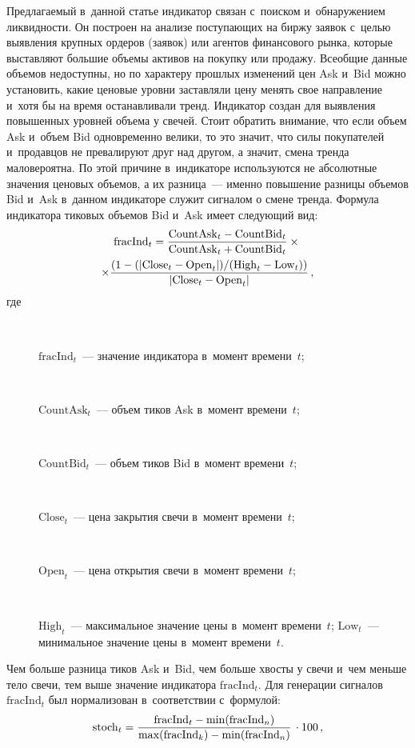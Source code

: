 {\begin{multicols}{2}
  Предлагаемый в~данной статье индикатор связан с~поиском и~обнаружением ликвидности. 
Он построен на анализе поступающих на биржу заявок с~целью выявления крупных ордеров 
(заявок) или агентов финансового рынка, которые выставляют большие объемы активов на 
покупку или продажу. Всеобщие данные объемов недоступны, но по характеру прошлых 
изменений цен Ask и~Bid можно установить, какие ценовые уровни заставляли цену менять 
свое направление и~хотя бы на время останавливали тренд. Индикатор создан для выявления 
повышенных уровней объема у свечей. Стоит обратить внимание, что если объем Ask 
и~объем Bid одновременно велики, то это значит, что силы покупателей и~продавцов не 
превалируют друг над другом, а значит, смена тренда маловероятна. По этой причине 
в~индикаторе используются не абсолютные значения ценовых объемов, а их разница~--- 
именно повышение разницы объемов Bid и~Ask в~данном индикаторе служит сигналом о 
смене тренда.  Формула индикатора тиковых объемов Bid и~Ask имеет следующий вид: 
  \begin{multline*}
  \mathrm{fracInd}_t= \displaystyle\frac{\displaystyle \mathrm{CountAsk}_t - \mathrm{CountBid}_t\mathstrut}{\displaystyle \mathrm{CountAsk}_t+\mathrm{CountBid}_t\mathstrut} \times{}\\
  \times \displaystyle\frac{\displaystyle (1- (\vert \mathrm{Close}_t-
\mathrm{Open}_t\vert )/(\mathrm{High}_t -\mathrm{Low}_t))\mathstrut}{\displaystyle \vert \mathrm{Close}_t -\mathrm{Open}_t\vert\mathstrut}\,,
  \end{multline*}
где 
\begin{description}
\item[\,] $\mathrm{fracInd}_t$~--- значение индикатора в~момент времени~$t$; 
\item[\,] $\mathrm{CountAsk}_t$~--- объем тиков Ask в~момент времени~$t$; 
\item[\,] $\mathrm{CountBid}_t$~--- объем тиков Bid в~момент времени~$t$; 
\item[\,] $\mathrm{Close}_t$~--- цена закрытия свечи в~момент времени~$t$; 
\item[\,] $\mathrm{Open}_t$~--- цена открытия свечи в~момент времени~$t$; 
\item[\,] $\mathrm{High}_t$~--- максимальное значение цены в~момент времени~$t$; 
$\mathrm{Low}_t$~--- минимальное значение цены в~момент времени~$t$.
\end{description}
 Чем больше разница тиков 
Ask и~Bid, чем больше хвосты у свечи и~чем меньше тело свечи, тем выше значение 
индикатора $\mathrm{fracInd}_t$. Для генерации сигналов $\mathrm{fracInd}_t$ был нормализован в~соответствии с~формулой:
$$
\mathrm{stoch}_t= \displaystyle\frac{\displaystyle \mathrm{fracInd}_t- \min(\mathrm{fracInd}_n)\mathstrut}{\displaystyle \max (\mathrm{fracInd}_k) -\min(\mathrm{fracInd}_n)\mathstrut}\,\cdot 100\,,
$$
\end{multicols}}
